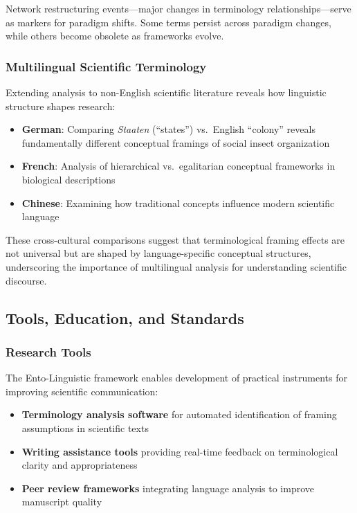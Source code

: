 \documentclass[
]{article}
\providecommand{\tightlist}{%
  \setlength{\itemsep}{0pt}\setlength{\parskip}{0pt}}
\numberwithin{equation}{section}
\begin{document}
Network restructuring events---major changes in terminology
relationships---serve as markers for paradigm shifts. Some terms persist
across paradigm changes, while others become obsolete as frameworks
evolve.

\subsubsection{Multilingual Scientific
Terminology}\label{multilingual-scientific-terminology}

Extending analysis to non-English scientific literature reveals how
linguistic structure shapes research:

\begin{itemize}
\tightlist
\item
  \textbf{German}: Comparing \emph{Staaten} (``states'') vs.~English
  ``colony'' reveals fundamentally different conceptual framings of
  social insect organization
\item
  \textbf{French}: Analysis of hierarchical vs.~egalitarian conceptual
  frameworks in biological descriptions
\item
  \textbf{Chinese}: Examining how traditional concepts influence modern
  scientific language
\end{itemize}

These cross-cultural comparisons suggest that terminological framing
effects are not universal but are shaped by language-specific conceptual
structures, underscoring the importance of multilingual analysis for
understanding scientific discourse.

\subsection{Tools, Education, and
Standards}\label{tools-education-and-standards}

\subsubsection{Research Tools}\label{research-tools}

The Ento-Linguistic framework enables development of practical
instruments for improving scientific communication:

\begin{itemize}
\tightlist
\item
  \textbf{Terminology analysis software} for automated identification of
  framing assumptions in scientific texts
\item
  \textbf{Writing assistance tools} providing real-time feedback on
  terminological clarity and appropriateness
\item
  \textbf{Peer review frameworks} integrating language analysis to
  improve manuscript quality
\end{itemize}
\end{document}
